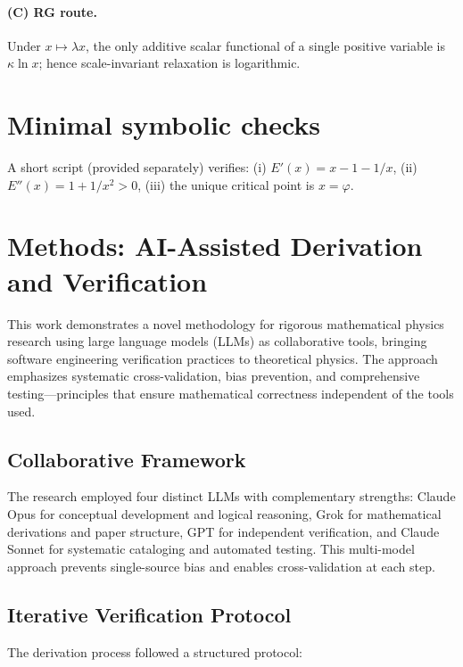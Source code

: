 \documentclass[11pt]{article}
\theoremstyle{remark}
\theoremstyle{definition}
\newcommand{\ph}{\varphi}
\begin{document}
\paragraph{(C) RG route.} Under $x\mapsto \lambda x$, the only additive scalar functional of a single positive variable is $\kappa\ln x$; hence scale-invariant relaxation is logarithmic.

\section{Minimal symbolic checks}
A short script (provided separately) verifies: (i) $E'(x)=x-1-1/x$, (ii) $E''(x)=1+1/x^2>0$, (iii) the unique critical point is $x=\ph$.

\section{Methods: AI-Assisted Derivation and Verification}

This work demonstrates a novel methodology for rigorous mathematical physics research using large language models (LLMs) as collaborative tools, bringing software engineering verification practices to theoretical physics. The approach emphasizes systematic cross-validation, bias prevention, and comprehensive testing—principles that ensure mathematical correctness independent of the tools used.

\subsection{Collaborative Framework}
The research employed four distinct LLMs with complementary strengths: Claude Opus for conceptual development and logical reasoning, Grok for mathematical derivations and paper structure, GPT for independent verification, and Claude Sonnet for systematic cataloging and automated testing. This multi-model approach prevents single-source bias and enables cross-validation at each step.

\subsection{Iterative Verification Protocol}
The derivation process followed a structured protocol:
\end{document}
